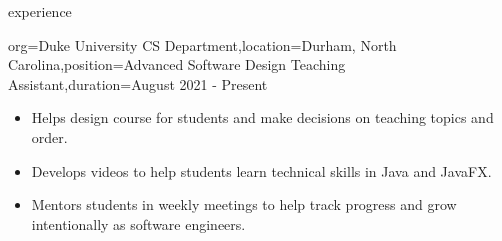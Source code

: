 \documentclass{resume}
\begin{document}
\begin{ResumeSection}{experience}
    \begin{ResumeSubsection}{org={Duke University CS Department},location={Durham, North Carolina},position={Advanced Software Design Teaching Assistant},duration={August 2021 - Present}}
        \begin{itemize}
            \item Helps design course for students and make decisions on teaching topics and order.
            \item Develops videos to help students learn technical skills in Java and JavaFX.
            \item Mentors students in weekly meetings to help track progress and grow intentionally as software engineers.
        \end{itemize}

    \end{ResumeSubsection}
\end{ResumeSection}
\end{document}
